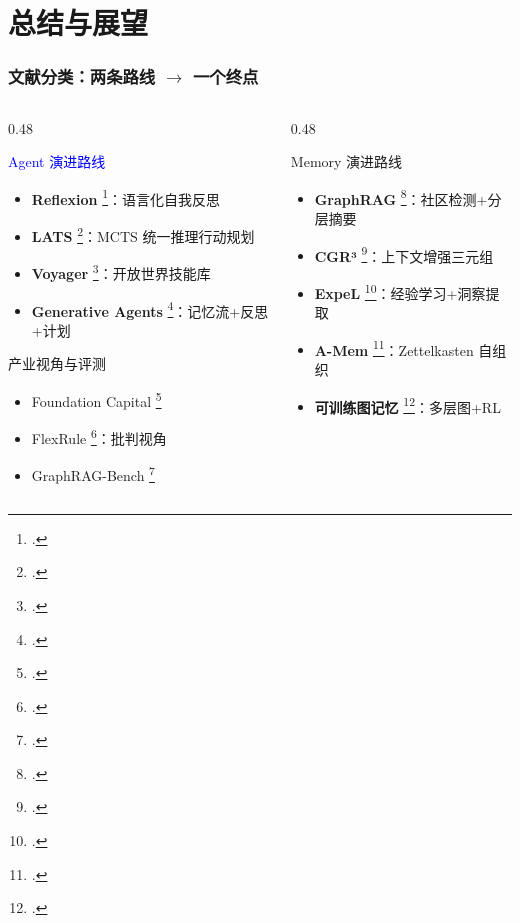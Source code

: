 \documentclass[aspectratio=169,10pt]{beamer}
\let\oldcite\cite
\renewcommand{\cite}[1]{\oldcite{#1}\footcitetext{#1}}
\begin{document}
\section{总结与展望}

\begin{frame}
  \frametitle{文献分类：两条路线 $\rightarrow$ 一个终点}

  \begin{columns}[T]
    \begin{column}{0.48\textwidth}
      \begin{block}{\textcolor{blue}{Agent 演进路线}}
        \small
        \begin{itemize}
          \item \textbf{Reflexion} \cite{shinn2023reflexion}：语言化自我反思
          \item \textbf{LATS} \cite{zhou2024lats}：MCTS 统一推理行动规划
          \item \textbf{Voyager} \cite{wang2024voyager}：开放世界技能库
          \item \textbf{Generative Agents} \cite{park2023generative}：记忆流+反思+计划
        \end{itemize}
      \end{block}

      \begin{block}{产业视角与评测}
        \small
        \begin{itemize}
          \item Foundation Capital \cite{foundationcapital2024context}
          \item FlexRule \cite{flexrule2024critique}：批判视角
          \item GraphRAG-Bench \cite{xiang2025graphragbench}
        \end{itemize}
      \end{block}
    \end{column}

    \begin{column}{0.48\textwidth}
      \begin{block}{\textcolor{green!50!black}{Memory 演进路线}}
        \small
        \begin{itemize}
          \item \textbf{GraphRAG} \cite{microsoft2024graphrag}：社区检测+分层摘要
          \item \textbf{CGR³} \cite{xu2024cgr3}：上下文增强三元组
          \item \textbf{ExpeL} \cite{zhao2024expel}：经验学习+洞察提取
          \item \textbf{A-Mem} \cite{xu2025amem}：Zettelkasten 自组织
          \item \textbf{可训练图记忆} \cite{xia2025trainable}：多层图+RL
        \end{itemize}
      \end{block}


\end{column}
\end{columns}
\end{frame}
\end{document}
